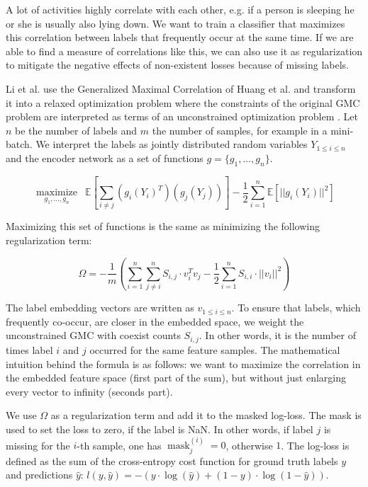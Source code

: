 A lot of activities highly correlate with each other, e.g. if a person is sleeping he or she is usually also lying down. We want to train a classifier that maximizes this correlation between labels that frequently occur at the same time. If we are able to find a measure of correlations like this, we can also use it as regularization to mitigate the negative effects of non-existent losses because of missing labels.

Li et al. use the Generalized Maximal Correlation of Huang et al.  and transform it into a relaxed optimization problem where the constraints of the original GMC problem are interpreted as terms of an unconstrained optimization problem \cite[Definition 2]{Huang2017}. Let $n$ be the number of labels and $m$ the number of samples, for example in a mini-batch. We interpret the labels as jointly distributed random variables $Y_{1\leq i \leq n}$ and the encoder network as a set of functions $g = \{g_1, \dots, g_n\}$.

\begin{equation}
	\underset{g_1, \dots, g_n}{\operatorname{maximize}} \hspace{6pt} \mathbb{E}\left[\sum_{i\neq j} 
	(g_i(Y_i)^T)(g_j(Y_j)) \right] - \frac{1}{2} \sum_{i=1}^{n} \mathbb{E}[||g_i(Y_i)||^2]
\end{equation}

Maximizing this set of functions is the same as minimizing the following regularization term:

\begin{equation}
	\Omega = - \frac{1}{m} \left(\sum_{i=1}^{n} \sum_{j \neq i}^{n} S_{i,j}\cdot v_i^T v_j - \frac{1}{2} \sum_{i=1}^{n} S_{i,i}\cdot ||v_i||^2 \right)
\end{equation}

The label embedding vectors are written as $v_{1\leq i \leq n}$. To ensure that labels, which frequently co-occur, are closer in the embedded space, we weight the unconstrained GMC with coexist counts $S_{i,j}$. In other words, it is the number of times label $i$ and $j$ occurred for the same feature samples. The mathematical intuition behind the formula is as follows: we want to maximize the correlation in the embedded feature space (first part of the sum), but without just enlarging every vector to infinity (seconds part).

We use $\Omega$ as a regularization term and add it to the masked log-loss. The mask is used to set the loss to zero, if the label is NaN. In other words, if label $j$ is missing for the $i$-th sample, one has $\operatorname{mask}_j^{(i)} = 0$, otherwise $1$.
The log-loss is defined as the sum of the cross-entropy cost function for ground truth labels $y$ and predictions $\hat{y}$: $l(y, \hat{y}) = -(y \cdot \log(\hat{y}) + (1 - y) \cdot \log(1 - \hat{y}))$.

